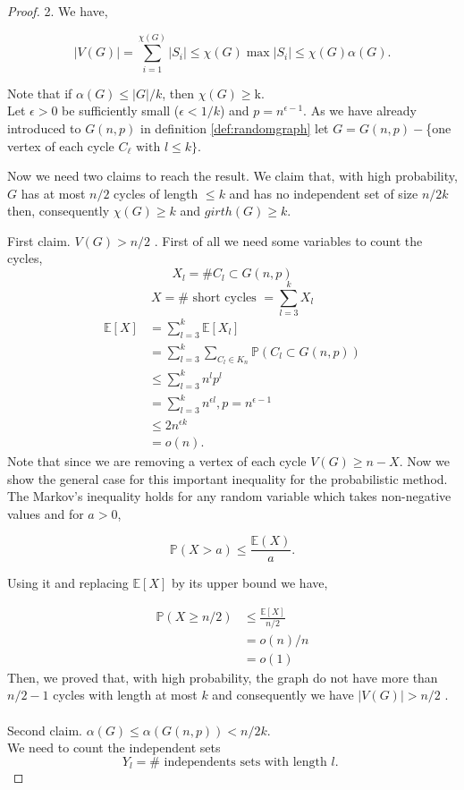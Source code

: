 \documentclass[12pt,twoside,a4paper]{book}
\numberwithin{equation}{section}
\theoremstyle{remark}
\begin{document}
\begin{proof}2.
We have,

$$ |V(G)| = \sum_{i=1}^{\chi(G)} |S_i| \leq \chi(G)\max|S_i| \leq \chi(G) \alpha (G) .$$

Note that if $\alpha(G) \leq |G|/k$, then $\chi(G) \geq $k. \\
Let $\epsilon > 0$ be sufficiently small ($\epsilon < 1/k$) and $p = n^{\epsilon - 1}$. As we have already introduced to $G(n,p)$ in definition \ref{def:randomgraph} let $G = G(n,p) -$\{one vertex of each cycle $C_{\ell} \text{ with } l\leq k\}$.

Now we need two claims to reach the result. We claim that, with high probability, $G$ has at most $n/2$ cycles of length $\leq k$ and has no independent set  of size $n/2k$ then, consequently $\chi(G) \geq k$ and $girth(G) \geq k$.

First claim. $V(G) > n/2$ . First of all we need some variables to count the cycles,
$$X_l = \# C_l \subset G(n,p)$$
$$X = \# \text{ short cycles } = \sum_{l=3}^k X_l$$
\begin{align*}
\mathbb{E}[X] &= \sum_{l=3}^k \mathbb{E}[X_l] \\
	       &= \sum_{l=3}^k \sum_{C_l \in K_n} \mathbb{P}(C_l \subset G(n,p))\\
	       &\leq \sum_{l=3}^k n^l p^l \\
	       &= \sum_{l=3}^k n^{\epsilon l}, p= n^{\epsilon - 1}\\
	       &\leq 2n^{\epsilon k} \\
	       &= o(n).
\end{align*}
Note that since we are removing a vertex of each cycle $V(G) \geq n-X$. Now we show the general case for this important inequality for the probabilistic method. The Markov's inequality holds for any random variable which takes non-negative values and for $a>0$,

$$\mathbb{P}(X>a) \leq \frac{\mathbb{E}(X)}{a}.$$

Using it and replacing $\mathbb{E}[X]$ by its upper bound we have,

\begin{align*}
\mathbb{P}(X\geq n/2) &\leq \frac{\mathbb{E}[X]}{n/2}\\
		& = o(n)/n\\
		& = o(1)
\end{align*}
Then, we proved that, with high probability, the graph do not have more than $n/2 -1$ cycles with length at most $k$ and consequently we have $|V(G)| > n/2$ .\\
\\
Second claim. $\alpha(G) \leq \alpha (G(n,p)) < n/2k$.\\
We need to count the independent sets
$$Y_l = \# \text{ independents sets with length $l$. }$$


\end{proof}
\end{document}
